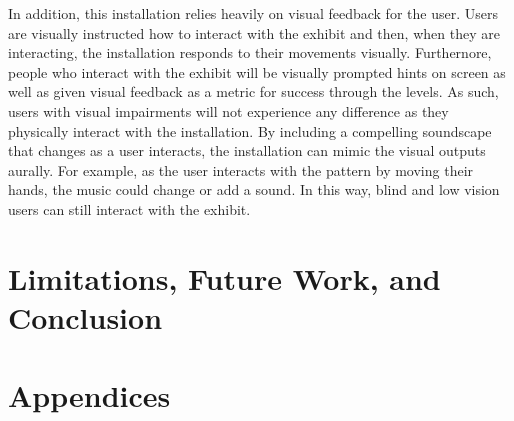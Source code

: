 \documentclass[10pt,twocolumn]{article}
\begin{document}
In addition, this installation relies heavily on visual feedback for the user.  Users are visually instructed how to interact with the exhibit and then, when they are interacting, the installation responds to their movements visually.  Furthernore, people who interact with the exhibit will be visually prompted hints on screen as well as given visual feedback as a metric for success through the levels. As such, users with visual impairments will not experience any difference as they physically interact with the installation. By including a compelling soundscape that changes as a user interacts, the installation can mimic the visual outputs aurally. For example, as the user interacts with the pattern by moving their hands, the music could change or add a sound.  In this way, blind and low vision users can still interact with the exhibit. 

\section{Limitations, Future Work, and Conclusion}

\section{Appendices}

\printbibliography 
\end{document}
